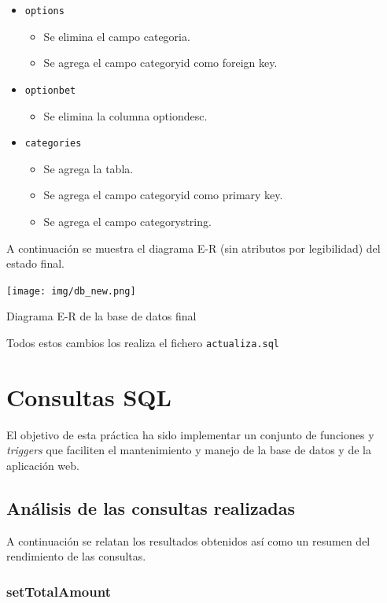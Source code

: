 \documentclass{article}
\begin{document}
\begin{itemize}
\begin{itemize}
        \end{itemize}
    \item\texttt{options}
        \begin{itemize}
            \item Se elimina el campo categoria.
            \item Se agrega el campo categoryid como foreign key.
        \end{itemize}
    \item\texttt{optionbet}
        \begin{itemize}
            \item Se elimina la columna optiondesc.
        \end{itemize}
    \item\texttt{categories}
        \begin{itemize}
            \item Se agrega la tabla.
            \item Se agrega el campo categoryid como primary key.
            \item Se agrega el campo categorystring.
        \end{itemize}
\end{itemize}
\newpage
A continuación se muestra el diagrama E-R (sin atributos por legibilidad) del estado final.
\smallbreak
\begin{minipage}{\linewidth}
    \centering
    \captionsetup{type=figure}
    \texttt{[image: img/db\_new.png]}
    \caption{Diagrama E-R de la base de datos final}
    \label{fig:fig2}
\end{minipage}

Todos estos cambios los realiza el fichero \texttt{actualiza.sql}

\section{Consultas SQL}
El objetivo de esta práctica ha sido implementar un conjunto de funciones y \textit{triggers} que faciliten el mantenimiento y manejo de la base de datos y de la aplicación web.
\subsection{Análisis de las consultas realizadas}
A continuación se relatan los resultados obtenidos así como un resumen del rendimiento de las consultas.
\subsubsection{setTotalAmount}
\end{document}
